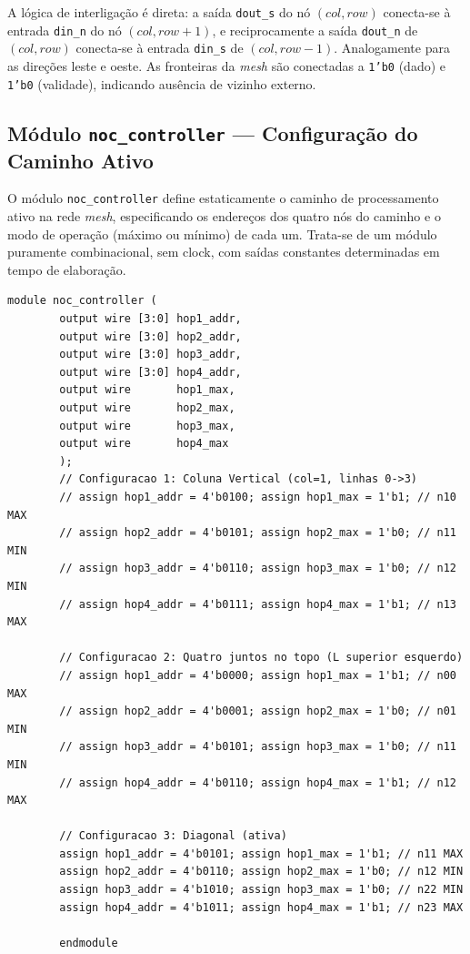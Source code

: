 \documentclass[12pt, a4paper]{article}
\begin{document}
	A lógica de interligação é direta: a saída \texttt{dout\_s} do nó $(col, row)$
	conecta-se à entrada \texttt{din\_n} do nó $(col, row+1)$, e reciprocamente a
	saída \texttt{dout\_n} de $(col, row)$ conecta-se à entrada \texttt{din\_s}
	de $(col, row-1)$. Analogamente para as direções leste e oeste. As fronteiras
	da \textit{mesh} são conectadas a \texttt{1'b0} (dado) e \texttt{1'b0}
	(validade), indicando ausência de vizinho externo.
	
	\subsection{Módulo \texttt{noc\_controller} --- Configuração do Caminho Ativo}
	
	O módulo \texttt{noc\_controller} define estaticamente o caminho de
	processamento ativo na rede \textit{mesh}, especificando os endereços dos
	quatro nós do caminho e o modo de operação (máximo ou mínimo) de cada um.
	Trata-se de um módulo puramente combinacional, sem clock, com saídas
	constantes determinadas em tempo de elaboração.
	
	\begin{lstlisting}[style=verilog, caption={\texttt{noc\_controller.v} --- Controlador estático do caminho de processamento da NoC, com três configurações de roteamento disponíveis.}, label={lst:noc}]
		module noc_controller (
		output wire [3:0] hop1_addr,
		output wire [3:0] hop2_addr,
		output wire [3:0] hop3_addr,
		output wire [3:0] hop4_addr,
		output wire       hop1_max,
		output wire       hop2_max,
		output wire       hop3_max,
		output wire       hop4_max
		);
		// Configuracao 1: Coluna Vertical (col=1, linhas 0->3)
		// assign hop1_addr = 4'b0100; assign hop1_max = 1'b1; // n10 MAX
		// assign hop2_addr = 4'b0101; assign hop2_max = 1'b0; // n11 MIN
		// assign hop3_addr = 4'b0110; assign hop3_max = 1'b0; // n12 MIN
		// assign hop4_addr = 4'b0111; assign hop4_max = 1'b1; // n13 MAX
		
		// Configuracao 2: Quatro juntos no topo (L superior esquerdo)
		// assign hop1_addr = 4'b0000; assign hop1_max = 1'b1; // n00 MAX
		// assign hop2_addr = 4'b0001; assign hop2_max = 1'b0; // n01 MIN
		// assign hop3_addr = 4'b0101; assign hop3_max = 1'b0; // n11 MIN
		// assign hop4_addr = 4'b0110; assign hop4_max = 1'b1; // n12 MAX
		
		// Configuracao 3: Diagonal (ativa)
		assign hop1_addr = 4'b0101; assign hop1_max = 1'b1; // n11 MAX
		assign hop2_addr = 4'b0110; assign hop2_max = 1'b0; // n12 MIN
		assign hop3_addr = 4'b1010; assign hop3_max = 1'b0; // n22 MIN
		assign hop4_addr = 4'b1011; assign hop4_max = 1'b1; // n23 MAX
		
		endmodule
	\end{lstlisting}
	
\end{document}
